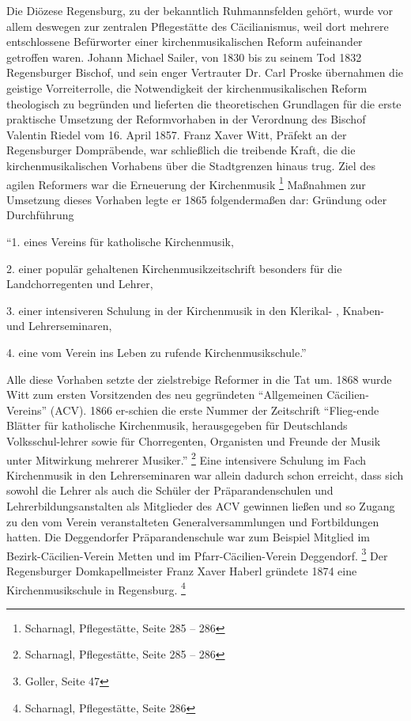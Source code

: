Die Diözese Regensburg, zu der bekanntlich Ruhmannsfelden gehört, wurde
vor allem deswegen zur zentralen Pflegestätte des Cäcilianismus, weil
dort mehrere entschlossene Befürworter einer kirchenmusikalischen
Reform aufeinander getroffen waren. Johann Michael Sailer, von 1830 bis
zu seinem Tod 1832 Regensburger Bischof, und sein enger Vertrauter Dr.
Carl Proske übernahmen die geistige Vorreiterrolle, die Notwendigkeit
der kirchenmusikalischen Reform theologisch zu begründen und lieferten
die theoretischen Grundlagen für die erste praktische Umsetzung der
Reformvorhaben in der Verordnung des Bischof Valentin Riedel vom 16.
April 1857. Franz Xaver Witt, Präfekt an der Regensburger Dompräbende,
war schließlich die treibende Kraft, die die kirchenmusikalischen
Vorhabens über die Stadtgrenzen hinaus trug. Ziel des agilen Reformers
war die Erneuerung der Kirchenmusik  \footnote{Scharnagl,
Pflegestätte, Seite 285 – 286} Maßnahmen zur Umsetzung dieses Vorhaben
legte er 1865 folgendermaßen dar: Gründung oder Durchführung

“1. eines Vereins für katholische Kirchenmusik,

2. einer populär gehaltenen Kirchenmusikzeitschrift besonders für die
Landchorregenten und Lehrer,

3. einer intensiveren Schulung in der Kirchenmusik in den Klerikal- ,
Knaben- und Lehrerseminaren,

4. eine vom Verein ins Leben zu rufende Kirchenmusikschule.”

Alle diese Vorhaben setzte der zielstrebige Reformer in die Tat um. 1868
wurde Witt zum ersten Vorsitzenden des neu gegründeten “Allgemeinen
Cäcilien-Vereins” (ACV). 1866 er-schien die erste Nummer der
Zeitschrift “Flieg-ende Blätter für katholische Kirchenmusik,
herausgegeben für Deutschlands Volksschul-lehrer sowie für
Chorregenten, Organisten und Freunde der Musik unter Mitwirkung
mehrerer Musiker.” \footnote{Scharnagl, Pflegestätte, Seite 285 – 286}
Eine intensivere Schulung im Fach Kirchenmusik in den Lehrerseminaren
war allein dadurch schon erreicht, dass sich sowohl die Lehrer als auch
die Schüler der Präparandenschulen und Lehrerbildungsanstalten als
Mitglieder des ACV gewinnen ließen und so Zugang zu den vom Verein
veranstalteten Generalversammlungen und Fortbildungen hatten. Die
Deggendorfer Präparandenschule war zum Beispiel Mitglied im
Bezirk-Cäcilien-Verein Metten und im Pfarr-Cäcilien-Verein
Deggendorf. \footnote{Goller, Seite 47} Der Regensburger
Domkapellmeister Franz Xaver Haberl gründete 1874 eine
Kirchenmusikschule in Regensburg. \footnote{Scharnagl, Pflegestätte,
Seite 286}

